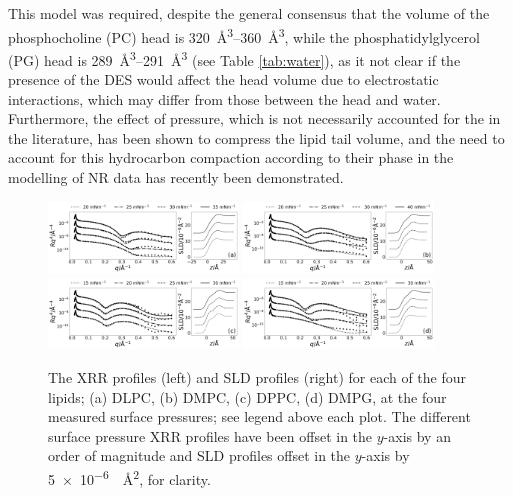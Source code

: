 \documentclass[%
 reprint,
 amsmath,amssymb,
 prl,
]{revtex4-1}
\begin{document}
This model was required, despite the general consensus that the volume of the phosphocholine (PC) head is \SIrange{320}{360}{\cubic\angstrom}, while the phosphatidylglycerol (PG) head is \SIrange{289}{291}{\cubic\angstrom} (see Table \ref{tab:water}), as it not clear if the presence of the DES would affect the head volume due to electrostatic interactions, which may differ from those between the head and water.
Furthermore, the effect of pressure, which is not necessarily accounted for the in the literature, has been shown to compress the lipid tail volume\cite{Marsh2010,Small1984}, and the need to account for this hydrocarbon compaction according to their phase in the modelling of NR data has recently been demonstrated\cite{Campbell2018}.
%
\begin{figure}
	\centering
	\includegraphics[width=0.45\textwidth]{figures/dlpc_ref_sld}
	\includegraphics[width=0.45\textwidth]{figures/dmpc_ref_sld}
	\includegraphics[width=0.45\textwidth]{figures/dppc_ref_sld}
	\includegraphics[width=0.45\textwidth]{figures/dmpg_ref_sld}
	\caption{The XRR profiles (left) and SLD profiles (right) for each of the four lipids; (a) DLPC, (b) DMPC, (c) DPPC, (d) DMPG, at the four measured surface pressures; see legend above each plot. The different surface pressure XRR profiles have been offset in the $y$-axis by an order of magnitude and SLD profiles offset in the $y$-axis by \SI{5e-6}{\per\square\angstrom}, for clarity.}
	\label{fig:lipids}
\end{figure}
%
\end{document}
